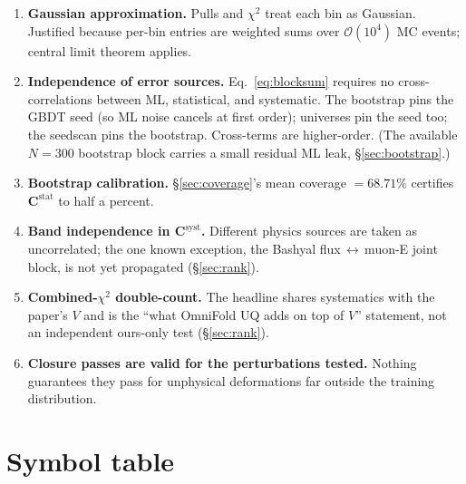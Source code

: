 \documentclass[12pt]{article}
\newcommand{\stat}{\text{stat}}
\newcommand{\syst}{\text{syst}}
\begin{document}
\begin{enumerate}[nosep]
  \item \textbf{Gaussian approximation.} Pulls and $\chi^{2}$ treat
        each bin as Gaussian. Justified because per-bin entries are
        weighted sums over $\mathcal{O}(10^{4})$ MC events; central
        limit theorem applies.
  \item \textbf{Independence of error sources.}
        Eq.~\eqref{eq:blocksum} requires no cross-correlations between
        ML, statistical, and systematic. The bootstrap pins the GBDT
        seed (so ML noise cancels at first order); universes pin the
        seed too; the seedscan pins the bootstrap. Cross-terms are
        higher-order. (The available $N=300$ bootstrap block carries a
        small residual ML leak, \S\ref{sec:bootstrap}.)
  \item \textbf{Bootstrap calibration.} \S\ref{sec:coverage}'s mean
        coverage $= 68.71\%$ certifies $\mathbf{C}^{\stat}$ to half a
        percent.
  \item \textbf{Band independence in $\mathbf{C}^{\syst}$.}
        Different physics sources are taken as uncorrelated; the one
        known exception, the Bashyal flux\,$\leftrightarrow$\,muon-E
        joint block, is not yet propagated (\S\ref{sec:rank}).
  \item \textbf{Combined-$\chi^{2}$ double-count.} The headline shares
        systematics with the paper's $V$ and is the ``what OmniFold UQ
        adds on top of $V$'' statement, not an independent ours-only
        test (\S\ref{sec:rank}).
  \item \textbf{Closure passes are valid for the perturbations
        tested.} Nothing guarantees they pass for unphysical
        deformations far outside the training distribution.
\end{enumerate}

\appendix

\section{Symbol table}
\label{app:notation}
\end{document}

